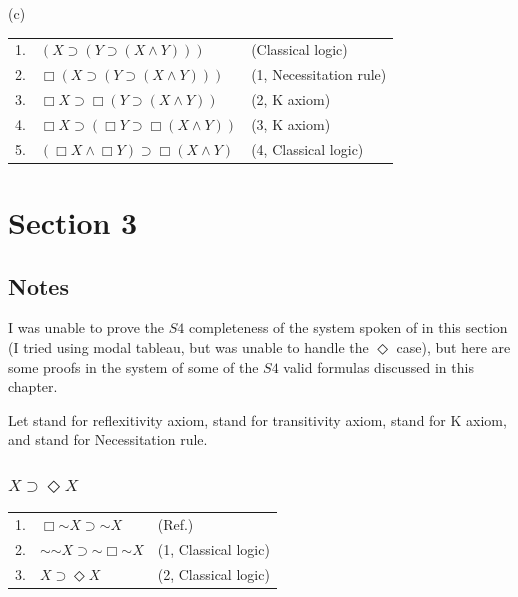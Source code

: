 \documentclass{article}
\newcommand*{\oldneg}{\mathord{\sim}}
\theoremstyle{definition}
\begin{document}
(c)
\begin{center}
\begin{tabular}{lll}
1. & $(X\supset (Y\supset (X\wedge Y)))$ & (Classical logic) \\
2. & $\Box (X\supset (Y\supset (X\wedge Y)))$ & (1, Necessitation rule) \\
3. & $\Box X\supset\Box (Y\supset (X\wedge Y))$ & (2, K axiom) \\
4. & $\Box X\supset (\Box Y\supset\Box (X\wedge Y))$ & (3, K axiom) \\
5. & $(\Box X\wedge\Box Y)\supset\Box (X\wedge Y)$ & (4, Classical logic)
\end{tabular}
\end{center}

\section*{Section 3}

\subsection*{Notes}

I was unable to prove the $S4$ completeness of the system spoken of in this section (I tried using modal tableau, but was unable to 
handle the $\Diamond$ case), but here 
are some proofs in the system of some of the $S4$ valid formulas discussed in this chapter. 

Let  stand for reflexitivity axiom,  stand for transitivity axiom,  stand for 
K axiom, and  stand for Necessitation rule.

\subsubsection*{$X\supset\Diamond X$}
\begin{center}
\begin{tabular}{lll}
1. & $\Box\oldneg X\supset\oldneg X$ & (Ref.) \\
2. & $\oldneg\oldneg X\supset\oldneg\Box\oldneg X$ & (1, Classical logic) \\
3. & $X\supset\Diamond X$ & (2, Classical logic)
\end{tabular}
\end{center}
\end{document}
